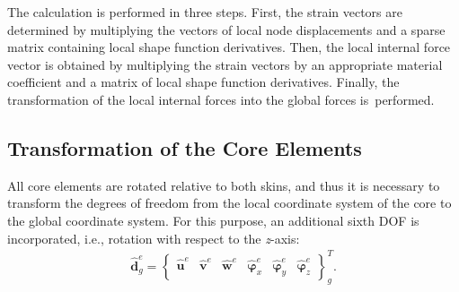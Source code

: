 \documentclass[sensors,article,accept,moreauthors,pdftex]{Definitions/mdpi}
\begin{document}
\begin{paracol}{2}
The calculation is performed in three steps.
First, the strain vectors are determined by multiplying the vectors of local node displacements and a sparse matrix containing local shape function derivatives.
Then, the local internal force vector is obtained by multiplying the strain vectors by an appropriate material coefficient and a matrix of local shape function derivatives.
Finally, the transformation of the local internal forces into the global forces is~performed.
\subsection{Transformation of the Core Elements}
\label{sec:transformation}
All core elements are rotated relative to both skins, and thus it is necessary to transform the degrees of freedom from the local coordinate system of the core to the global coordinate system.
For this purpose, an additional sixth DOF is incorporated, i.e., rotation with respect to the \textit{z}-axis:
\begin{eqnarray}
	\widehat{\textbf{d}}^e_g = \left \{\begin{array}{cccccc}
		\widehat{\textbf{u}}^e & \widehat{\textbf{v}}^e &
		\widehat{\textbf{w}}^e & \widehat{\boldsymbol{\varphi}}_x^e &
		\widehat{\boldsymbol{\varphi}}_y^e & \widehat{\boldsymbol{\varphi}}_z^e
	\end{array}\right \}^T_g.
	\label{eq:d6}
\end{eqnarray}


\end{paracol}
\end{document}
